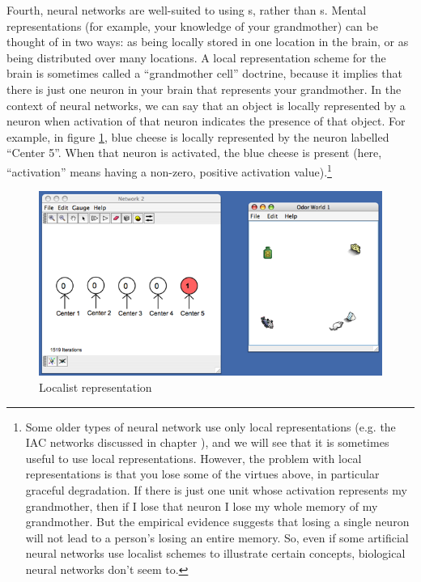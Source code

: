 Fourth, neural networks are well-suited to using s, rather than s. Mental representations (for example, your knowledge of your grandmother) can be thought of in two ways: as being locally stored in one location in the brain, or as being distributed over many locations. A local representation scheme for the brain is sometimes called a ``grandmother cell'' doctrine, because it implies that there is just one neuron in your brain that represents your grandmother. In the context of neural networks, we can say that an object is locally represented by a neuron when activation of that neuron indicates the presence of that object. For example, in figure \ref{localist}, blue cheese is locally represented by the neuron labelled ``Center 5''. When that neuron is activated, the blue cheese is present (here, ``activation'' means having a non-zero, positive activation value).\footnote{Some older types of neural network use only local representations (e.g. the IAC networks discussed in chapter ), and we will see that it is sometimes useful to use local representations. However, the problem with local representations is that you lose some of the virtues above, in particular graceful degradation. If there is just one unit whose activation represents my grandmother, then if I lose that neuron I lose my whole memory of my grandmother. But the empirical evidence suggests that losing a single neuron will not lead to a person's losing an entire memory. So, even if some artificial neural networks use localist schemes to illustrate certain concepts, biological neural networks don't seem to.}



\begin{figure}[h]
\centering
\includegraphics[scale=.3]{./images/Local_Rep.png}
\caption{Localist representation}
\label{localist}
\end{figure}

